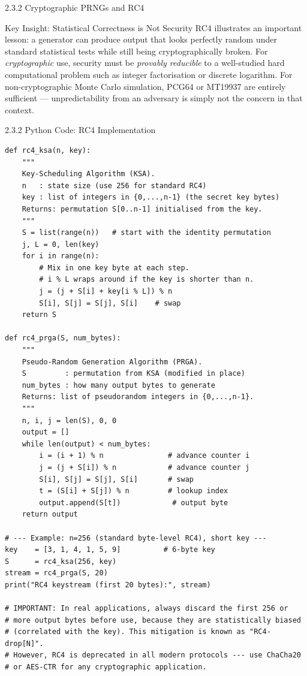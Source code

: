 \documentclass[aspectratio=169,10pt]{beamer}
\begin{document}
\begin{frame}[allowframebreaks]{2.3.2 Cryptographic PRNGs and RC4}
\begin{alertblock}{Key Insight: Statistical Correctness is Not Security}
RC4 illustrates an important lesson: a generator can produce output that looks
perfectly random under standard statistical tests while still being
cryptographically broken.  For \emph{cryptographic} use, security must be
\emph{provably reducible} to a well-studied hard computational problem such as
integer factorisation or discrete logarithm.  For non-cryptographic Monte
Carlo simulation, PCG64 or MT19937 are entirely sufficient --- unpredictability
from an adversary is simply not the concern in that context.
\end{alertblock}

\end{frame}

\begin{frame}[fragile]{2.3.2 Python Code: RC4 Implementation}

\begin{lstlisting}[style=python]
def rc4_ksa(n, key):
    """
    Key-Scheduling Algorithm (KSA).
    n   : state size (use 256 for standard RC4)
    key : list of integers in {0,...,n-1} (the secret key bytes)
    Returns: permutation S[0..n-1] initialised from the key.
    """
    S = list(range(n))   # start with the identity permutation
    j, L = 0, len(key)
    for i in range(n):
        # Mix in one key byte at each step.
        # i % L wraps around if the key is shorter than n.
        j = (j + S[i] + key[i % L]) % n
        S[i], S[j] = S[j], S[i]    # swap
    return S

def rc4_prga(S, num_bytes):
    """
    Pseudo-Random Generation Algorithm (PRGA).
    S         : permutation from KSA (modified in place)
    num_bytes : how many output bytes to generate
    Returns: list of pseudorandom integers in {0,...,n-1}.
    """
    n, i, j = len(S), 0, 0
    output = []
    while len(output) < num_bytes:
        i = (i + 1) % n               # advance counter i
        j = (j + S[i]) % n            # advance counter j
        S[i], S[j] = S[j], S[i]       # swap
        t = (S[i] + S[j]) % n         # lookup index
        output.append(S[t])            # output byte
    return output

# --- Example: n=256 (standard byte-level RC4), short key ---
key    = [3, 1, 4, 1, 5, 9]          # 6-byte key
S      = rc4_ksa(256, key)
stream = rc4_prga(S, 20)
print("RC4 keystream (first 20 bytes):", stream)

# IMPORTANT: In real applications, always discard the first 256 or
# more output bytes before use, because they are statistically biased
# (correlated with the key). This mitigation is known as "RC4-drop[N]".
# However, RC4 is deprecated in all modern protocols --- use ChaCha20
# or AES-CTR for any cryptographic application.
\end{lstlisting}

\end{frame}
\end{document}
